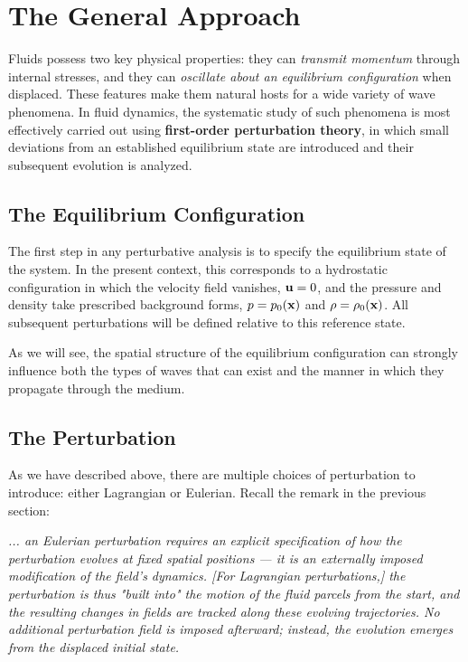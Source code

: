 \section{The General Approach}

Fluids possess two key physical properties: they can \emph{transmit momentum} through internal stresses, and they can \emph{oscillate about an equilibrium configuration} when displaced. These features make them natural hosts for a wide variety of wave phenomena. In fluid dynamics, the systematic study of such phenomena is most effectively carried out using \textbf{first-order perturbation theory}, in which small deviations from an established equilibrium state are introduced and their subsequent evolution is analyzed.

\subsection*{The Equilibrium Configuration}

The first step in any perturbative analysis is to specify the equilibrium state of the system. In the present context, this corresponds to a hydrostatic configuration in which the velocity field vanishes, ${\bf u} = 0$, and the pressure and density take prescribed background forms, $p = p_0({\bf x})$ and $\rho = \rho_0({\bf x})$. All subsequent perturbations will be defined relative to this reference state.

\begin{remark}
    As we will see, the spatial structure of the equilibrium configuration can strongly influence both the types of waves that can exist and the manner in which they propagate through the medium.
\end{remark}

\subsection*{The Perturbation}

As we have described above, there are multiple choices of perturbation to introduce: either Lagrangian or Eulerian. Recall the remark in the previous section:

\begin{center}
\textit{    ... an Eulerian perturbation requires an explicit specification of how the perturbation evolves at fixed spatial positions — it is an externally imposed modification of the field's dynamics. [For Lagrangian perturbations,] the perturbation is thus "built into" the motion of the fluid parcels from the start, and the resulting changes in fields are tracked along these evolving trajectories. No additional perturbation field is imposed afterward; instead, the evolution emerges from the displaced initial state.}
\end{center}

